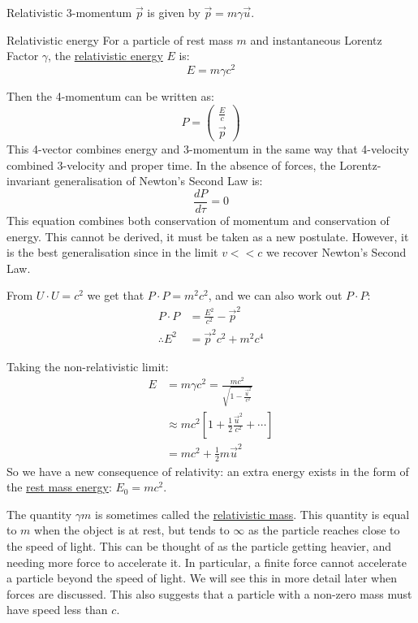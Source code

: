 \documentclass[../Main.tex]{subfiles}
\begin{document}
Relativistic 3-momentum $\vec{p}$ is given by $\vec{p} = m\gamma \vec{u}$.
\begin{definition}{Relativistic energy}
    For a particle of rest mass $m$ and instantaneous Lorentz Factor $\gamma$, the \underline{relativistic energy} $E$ is:
    \begin{equation*}
        E = m\gamma c^2
    \end{equation*}
\end{definition}
Then the 4-momentum can be written as:
\begin{equation*}
    P = \begin{pmatrix}\frac{E}{c} \\ \vec{p} \end{pmatrix}
\end{equation*}
This 4-vector combines energy and 3-momentum in the same way that 4-velocity combined 3-velocity and proper time. In the absence of forces, the Lorentz-invariant generalisation of Newton's Second Law is:
\begin{equation}
    \frac{dP}{d\tau} = 0
    \label{eqnNewtonIRelativity}
\end{equation}
This equation combines both conservation of momentum and conservation of energy. This cannot be derived, it must be taken as a new postulate. However, it is the best generalisation since in the limit $v << c$ we recover Newton's Second Law.

From $U \cdot U = c^2$ we get that $P \cdot P = m^2 c^2$, and we can also work out $P \cdot P$:
\begin{align*}
    P \cdot P &= \frac{E^2}{c^2} - \vec{p}^2 \\
    \therefore E^2 &= \vec{p}^2 c^2 + m^2 c^4
\end{align*}

Taking the non-relativistic limit:
\begin{align*}
    E &= m\gamma c^2 = \frac{mc^2}{\sqrt{1 - \frac{\vec{u}^2}{c^2}}} \\
    &\approx mc^2 \left[1 + \frac{1}{2} \frac{\vec{u}^2}{c^2} + \cdots \right] \\
    &= mc^2 + \frac{1}{2} m\vec{u}^2
\end{align*}
So we have a new consequence of relativity: an extra energy exists in the form of the \underline{rest mass energy}: $E_0 = mc^2$.

The quantity $\gamma m$ is sometimes called the \underline{relativistic mass}. This quantity is equal to $m$ when the object is at rest, but tends to $\infty$ as the particle reaches close to the speed of light. This can be thought of as the particle getting heavier, and needing more force to accelerate it. In particular, a finite force cannot accelerate a particle beyond the speed of light. We will see this in more detail later when forces are discussed. This also suggests that a particle with a non-zero mass must have speed less than $c$.
\end{document}
